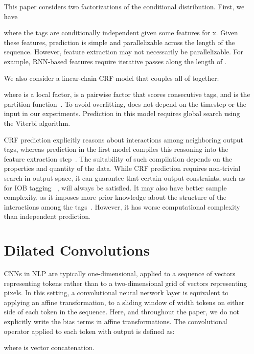 \documentclass[11pt,letterpaper]{article}
\begin{document}
This paper considers two factorizations of the conditional distribution. First, we have

where the tags are conditionally independent given some features for x. Given these features,  prediction is simple and parallelizable across the length of the sequence. However, feature extraction may not necessarily be parallelizable. For example, RNN-based features require iterative passes along the length of .

We also consider a linear-chain CRF model that couples all of  together:

where  is a local factor,  is a pairwise factor that scores consecutive tags, and  is the partition function~\citep{lafferty2001conditional}. To avoid overfitting,  does not depend on the timestep  or the input  in our experiments. Prediction in this model requires global search using the  Viterbi algorithm. 

CRF prediction explicitly reasons about interactions among neighboring output tags, whereas prediction in the first model compiles this reasoning into the feature extraction step~\citep{liang2008structure}. The suitability of such compilation depends on the properties and quantity of the data. While CRF prediction requires non-trivial search in output space, it can guarantee that certain output constraints, such as for IOB tagging ~\citep{ramshaw1999text}, will always be satisfied. It may also have better sample complexity, as it imposes more prior knowledge about the structure of the interactions among the tags~\citep{JMLR:v17:15-501}. However, it has worse computational complexity than independent prediction.

\section{Dilated Convolutions}



CNNs in NLP are typically one-dimensional, applied to a sequence of vectors representing tokens rather than to a two-dimensional grid of vectors representing pixels. In this setting, a convolutional neural network layer is equivalent to applying an affine transformation,  to a sliding window of width  tokens on either side of each token in the sequence. Here, and throughout the paper, we do not explicitly write the bias terms in affine transformations. The convolutional operator applied to each token  with output  is defined as:

where  is vector concatenation.
\end{document}
